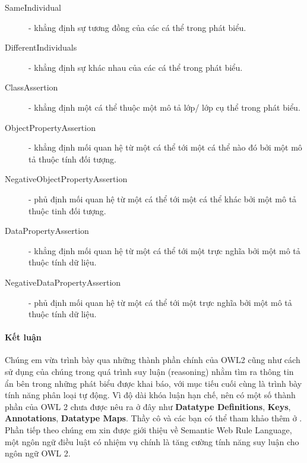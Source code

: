 	\begin{description}
		\item[SameIndividual] - khẳng định sự tương đồng của các cá thể trong phát biểu.
		
		\item[DifferentIndividuals] - khẳng định sự khác nhau của các cá thể trong phát biểu.
		
		\item[ClassAssertion] - khẳng định một cá thể thuộc một mô tả lớp/ lớp cụ thể trong phát biểu.
		
		\item[ObjectPropertyAssertion] - khẳng định mối quan hệ từ một cá thể tới một cá thể nào đó bởi một mô tả thuộc tính đối tượng.
		
		\item[NegativeObjectPropertyAssertion] - phủ định mối quan hệ từ một cá thể tới một cá thể khác bởi một mô tả thuộc tinh đối tượng.
		
		\item[DataPropertyAssertion] - khẳng định mối quan hệ từ một cá thể tới một trực nghĩa bởi một mô tả thuộc tính dữ liệu.
		
		\item[NegativeDataPropertyAssertion] - phủ định mối quan hệ từ một cá thể tới một trực nghĩa bởi một mô tả thuộc tính dữ liệu.
	\end{description}
	
\paragraph{Kết luận} Chúng em vừa trình bày qua những thành phần chính của OWL2 cũng như cách sử dụng của chúng trong quá trình suy luận (reasoning) nhằm tìm ra thông tin ẩn bên trong những phát biểu được khai báo, với mục tiếu cuối cùng là trình bày tính năng phân loại tự động. Vì độ dài khóa luận hạn chế, nên có một số thành phần của OWL 2 chưa được nêu ra ở đây như \textbf{Datatype Definitions}, \textbf{Keys}, \textbf{Annotations}, \textbf{Datatype Maps}. Thầy cô và các bạn có thể tham khảo thêm ở \cite{owl2spec}. Phần tiếp theo chúng em xin được giới thiệu về Semantic Web Rule Language, một ngôn ngữ điều luật có nhiệm vụ chính là tăng cường tính năng suy luận cho ngôn ngữ OWL 2.
